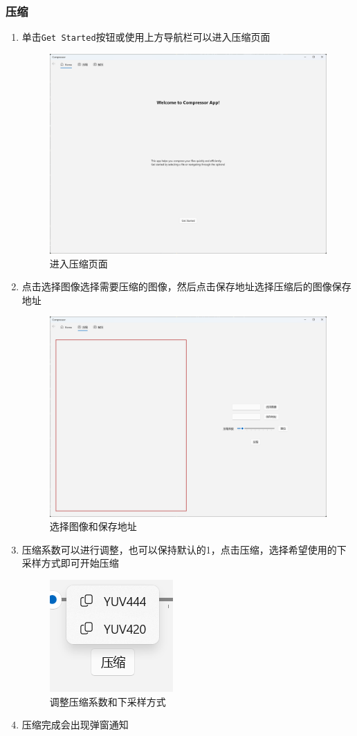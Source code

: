 \documentclass{article}
\begin{document}
\subsubsection{压缩}
\begin{enumerate}
    \item 单击\texttt{Get Started}按钮或使用上方导航栏可以进入压缩页面
    \begin{figure}[H]
        \centering
        \includegraphics[width=0.6\linewidth]{assets/image-2.png}
        \caption{进入压缩页面}
    \end{figure}
    \item 点击选择图像选择需要压缩的图像，然后点击保存地址选择压缩后的图像保存地址
    \begin{figure}[H]
        \centering
        \includegraphics[width=0.6\linewidth]{assets/image-3.png}
        \caption{选择图像和保存地址}
    \end{figure}
    \item 压缩系数可以进行调整，也可以保持默认的1，点击压缩，选择希望使用的下采样方式即可开始压缩
    \begin{figure}[H]
        \centering
        \includegraphics[width=0.3\linewidth]{assets/image-5.png}
        \caption{调整压缩系数和下采样方式}
    \end{figure}
    \item 压缩完成会出现弹窗通知
\end{enumerate}
\end{document}
